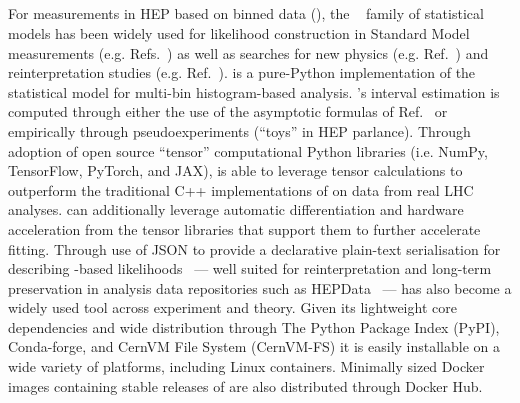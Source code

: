 \subsection{\pyhf{}}\label{subsec:pyhf}

For measurements in HEP based on binned data (), the \HiFa{}~\cite{Cranmer:1456844} family of statistical models has been widely used for likelihood construction in Standard Model measurements (e.g. Refs.~\cite{HIGG-2013-02,Aaij:2015sqa}) as well as searches for new physics (e.g. Ref.~\cite{SUSY-2016-10}) and reinterpretation studies (e.g. Ref.~\cite{Alguero:2020grj}).
\pyhf{} is a pure-Python implementation of the \HiFa{} statistical model for multi-bin histogram-based analysis.
\pyhf{}'s interval estimation is computed through either the use of the asymptotic formulas of Ref.~\cite{Cowan:2010js} or empirically through pseudoexperiments (``toys'' in HEP parlance).
Through adoption of open source ``tensor'' computational Python libraries (i.e. NumPy, TensorFlow, PyTorch, and JAX), \pyhf{} is able to leverage tensor calculations to outperform the traditional C++ implementations of \HiFa{} on data from real LHC analyses.
\pyhf{} can additionally leverage automatic differentiation and hardware acceleration from the tensor libraries that support them to further accelerate fitting.
Through use of JSON to provide a declarative plain-text serialisation for describing \HiFa{}-based likelihoods~\cite{ATL-PHYS-PUB-2019-029} --- well suited for reinterpretation and long-term preservation in analysis data repositories such as HEPData~\cite{Maguire:2017ypu} --- \pyhf{} has also become a widely used tool across experiment and theory.
Given its lightweight core dependencies and wide distribution through The Python Package Index (PyPI), Conda-forge, and CernVM File System (CernVM-FS) it is easily installable on a wide variety of platforms, including Linux containers.
Minimally sized Docker images containing stable releases of \pyhf{} are also distributed through Docker Hub.
